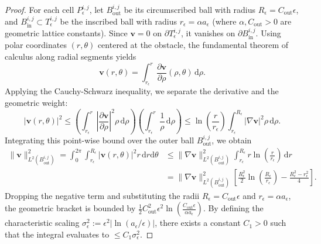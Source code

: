 \documentclass[10pt,a4paper]{amsart}
\begin{document}
\begin{proof}
    For each cell $P_\epsilon^{i,j}$, let $B_{\mathrm{out}}^{i,j}$ be its circumscribed ball with radius $R_{\epsilon} = C_{\mathrm{out}} \epsilon$, and $B_{\mathrm{in}}^{i,j} \subset T_{\epsilon}^{i,j}$ be the inscribed ball with radius $r_{\epsilon} = \alpha a_{\epsilon}$ (where $\alpha, C_{\mathrm{out}} > 0$ are geometric lattice constants). Since $\mathbf{v} = 0$ on $\partial T_{\epsilon}^{i,j}$, it vanishes on $\partial B_{\mathrm{in}}^{i,j}$. Using polar coordinates $(r, \theta)$ centered at the obstacle, the fundamental theorem of calculus along radial segments yields
    \begin{equation}
        \mathbf{v}(r, \theta) = \int_{r_{\epsilon}}^r \frac{\partial \mathbf{v}}{\partial \rho}(\rho, \theta) \, \mathrm{d}\rho.
    \end{equation}
    Applying the Cauchy-Schwarz inequality, we separate the derivative and the geometric weight:
    \begin{equation}
        |\mathbf{v}(r, \theta)|^2 \le \left( \int_{r_{\epsilon}}^r \left| \frac{\partial \mathbf{v}}{\partial \rho} \right|^2 \rho \, \mathrm{d}\rho \right) \left( \int_{r_{\epsilon}}^r \frac{1}{\rho} \, \mathrm{d}\rho \right) \le \ln\left(\frac{r}{r_{\epsilon}}\right) \int_{r_{\epsilon}}^{R_{\epsilon}} |\nabla \mathbf{v}|^2 \rho \, \mathrm{d}\rho.
    \end{equation}
    Integrating this point-wise bound over the outer ball $B_{\mathrm{out}}^{i,j}$, we obtain
    \begin{align}
        \|\mathbf{v}\|_{L^2(B_{\mathrm{out}}^{i,j})}^2 = \int_0^{2\pi} \int_{r_{\epsilon}}^{R_{\epsilon}} |\mathbf{v}(r, \theta)|^2 r \, \mathrm{d}r \mathrm{d}\theta & \le \|\nabla \mathbf{v}\|_{L^2(B_{\mathrm{out}}^{i,j})}^2 \int_{r_{\epsilon}}^{R_{\epsilon}} r \ln\left(\frac{r}{r_{\epsilon}}\right) \, \mathrm{d}r \nonumber                                 \\
                                                                                                                                                                      & = \|\nabla \mathbf{v}\|_{L^2(B_{\mathrm{out}}^{i,j})}^2 \left[ \frac{R_{\epsilon}^2}{2} \ln\left(\frac{R_{\epsilon}}{r_{\epsilon}}\right) - \frac{R_{\epsilon}^2 - r_{\epsilon}^2}{4} \right].
    \end{align}
    Dropping the negative term and substituting the radii $R_{\epsilon} = C_{\mathrm{out}}\epsilon$ and $r_{\epsilon} = \alpha a_{\epsilon}$, the geometric bracket is bounded by $\frac{1}{2} C_{\mathrm{out}}^2 \epsilon^2 \ln\left(\frac{C_{\mathrm{out}} \epsilon}{\alpha a_{\epsilon}}\right)$. By defining the characteristic scaling $\sigma_{\epsilon}^2 := \epsilon^2 |\ln(a_{\epsilon}/\epsilon)|$, there exists a constant $C_1 > 0$ such that the integral evaluates to $\le C_1 \sigma_{\epsilon}^2$.


\end{proof}
\end{document}
